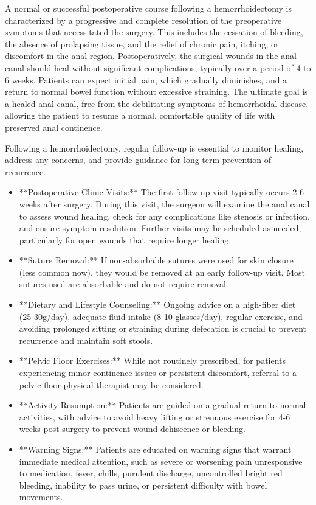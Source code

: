 A normal or successful postoperative course following a hemorrhoidectomy is characterized by a progressive and complete resolution of the preoperative symptoms that necessitated the surgery. This includes the cessation of bleeding, the absence of prolapsing tissue, and the relief of chronic pain, itching, or discomfort in the anal region. Postoperatively, the surgical wounds in the anal canal should heal without significant complications, typically over a period of 4 to 6 weeks. Patients can expect initial pain, which gradually diminishes, and a return to normal bowel function without excessive straining. The ultimate goal is a healed anal canal, free from the debilitating symptoms of hemorrhoidal disease, allowing the patient to resume a normal, comfortable quality of life with preserved anal continence.

Following a hemorrhoidectomy, regular follow-up is essential to monitor healing, address any concerns, and provide guidance for long-term prevention of recurrence.

\begin{itemize}
  \item **Postoperative Clinic Visits:** The first follow-up visit typically occurs 2-6 weeks after surgery. During this visit, the surgeon will examine the anal canal to assess wound healing, check for any complications like stenosis or infection, and ensure symptom resolution. Further visits may be scheduled as needed, particularly for open wounds that require longer healing.
  
  \item **Suture Removal:** If non-absorbable sutures were used for skin closure (less common now), they would be removed at an early follow-up visit. Most sutures used are absorbable and do not require removal.
  
  \item **Dietary and Lifestyle Counseling:** Ongoing advice on a high-fiber diet (25-30g/day), adequate fluid intake (8-10 glasses/day), regular exercise, and avoiding prolonged sitting or straining during defecation is crucial to prevent recurrence and maintain soft stools.
  
  \item **Pelvic Floor Exercises:** While not routinely prescribed, for patients experiencing minor continence issues or persistent discomfort, referral to a pelvic floor physical therapist may be considered.
  
  \item **Activity Resumption:** Patients are guided on a gradual return to normal activities, with advice to avoid heavy lifting or strenuous exercise for 4-6 weeks post-surgery to prevent wound dehiscence or bleeding.
  
  \item **Warning Signs:** Patients are educated on warning signs that warrant immediate medical attention, such as severe or worsening pain unresponsive to medication, fever, chills, purulent discharge, uncontrolled bright red bleeding, inability to pass urine, or persistent difficulty with bowel movements.
\end{itemize}

